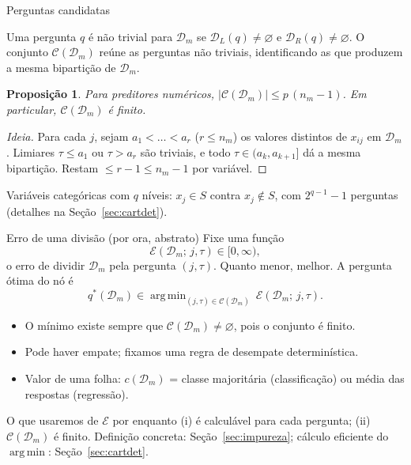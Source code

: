 \documentclass[aspectratio=169]{beamer}
\newtheorem{proposition}[theorem]{Proposição}
\DeclareMathOperator*{\argmin}{arg\,min}
\newcommand{\Err}{\mathcal E}
\newcommand{\Cand}{\mathcal C}            %
\begin{document}
\begin{frame}{Perguntas candidatas}
\begin{definition}
Uma pergunta $q$ é \alert{não trivial} para $\mathcal D_m$ se $\mathcal D_L(q)\ne\varnothing$ e $\mathcal D_R(q)\ne\varnothing$. O conjunto $\Cand(\mathcal D_m)$ reúne as perguntas não triviais, identificando as que produzem a mesma bipartição de $\mathcal D_m$.
\end{definition}
\begin{proposition}
Para preditores numéricos, $|\Cand(\mathcal D_m)|\le p\,(n_m-1)$. Em particular, $\Cand(\mathcal D_m)$ é \alert{finito}.
\end{proposition}
\begin{proof}[Ideia]
Para cada $j$, sejam $a_1<\dots<a_r$ ($r\le n_m$) os valores distintos de $x_{ij}$ em $\mathcal D_m$. Limiares $\tau\le a_1$ ou $\tau>a_r$ são triviais, e todo $\tau\in(a_k,a_{k+1}]$ dá a mesma bipartição. Restam $\le r-1\le n_m-1$ por variável.
\end{proof}
{\footnotesize Variáveis categóricas com $q$ níveis: $x_j\in S$ contra $x_j\notin S$, com $2^{q-1}-1$ perguntas (detalhes na Seção~\ref{sec:cartdet}).}
\end{frame}

\begin{frame}{Erro de uma divisão (por ora, abstrato)}
Fixe uma função
\[
\Err(\mathcal D_m;\,j,\tau)\in[0,\infty),
\]
o \alert{erro} de dividir $\mathcal D_m$ pela pergunta $(j,\tau)$. Quanto menor, melhor. A \alert{pergunta ótima} do nó é
\[
q^*(\mathcal D_m)\in\argmin_{(j,\tau)\in\Cand(\mathcal D_m)}\ \Err(\mathcal D_m;\,j,\tau).
\]
\begin{itemize}
  \item O mínimo existe sempre que $\Cand(\mathcal D_m)\ne\varnothing$, pois o conjunto é finito.
  \item Pode haver empate; fixamos uma regra de desempate determinística.
  \item Valor de uma folha: $c(\mathcal D_m)$ = classe majoritária (classificação) ou média das respostas (regressão).
\end{itemize}
\begin{block}{O que usaremos de $\Err$ por enquanto}
(i) é calculável para cada pergunta; (ii) $\Cand(\mathcal D_m)$ é finito. Definição concreta: Seção~\ref{sec:impureza}; cálculo eficiente do $\argmin$: Seção~\ref{sec:cartdet}.
\end{block}
\end{frame}
\end{document}
